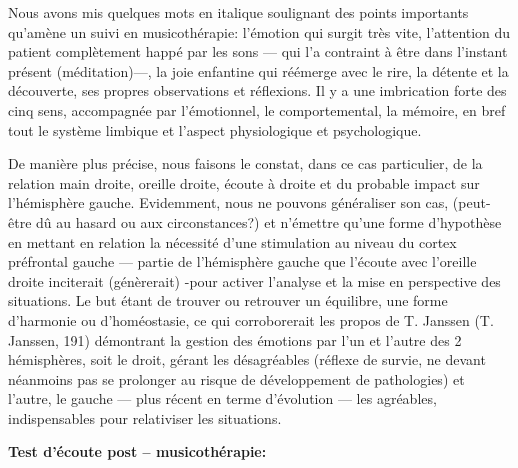       Nous avons mis quelques mots en italique soulignant des  points
      importants qu'amè\-ne un suivi en musicothérapie: l'émotion qui surgit très
      vite,
      l'attention du patient complètement happé par les sons --- qui l'a
      contraint à être dans l'instant présent (méditation)---, la joie
      enfantine qui réémerge avec le rire, la détente et la découverte,
      ses propres observations et réflexions.
      Il y a une imbrication forte des cinq sens, accompagnée par l'émotionnel, le comportemental, la
      mémoire, en bref tout le système limbique et l'aspect
      physiologique et psychologique.

      De manière plus précise, nous faisons le constat, dans ce cas
      particulier,  de la relation main droite, oreille droite, écoute
      à droite et du probable impact sur l'hémisphère gauche.
      Evidemment, nous ne pouvons généraliser son cas, (peut-être dû au hasard ou aux circonstances?) et n'émettre qu'une forme d'hypothèse
      en mettant en relation la nécessité d'une stimulation au niveau du cortex préfrontal
      gauche --- partie de l'hémisphère gauche que l'écoute avec
      l'oreille droite inciterait (génèrerait) -pour activer l'analyse et la
      mise en perspective des situations. Le but étant de trouver ou
      retrouver un équilibre, une forme d'harmonie ou d'homéostasie, ce qui corroborerait les
      propos de T. Janssen (T. Janssen, 191)  démontrant la gestion des émotions par
      l'un et l'autre des 2 hémisphères, soit le droit,  gérant les désagréables
      (réflexe de survie, ne devant néanmoins pas se prolonger au risque de
      développement de pathologies)
      et l'autre, le gauche --- plus récent en terme d'évolution ---  les
      agréables, indispensables pour relativiser les situations.


\textbf{ Test d'écoute post -- musicothérapie:}



